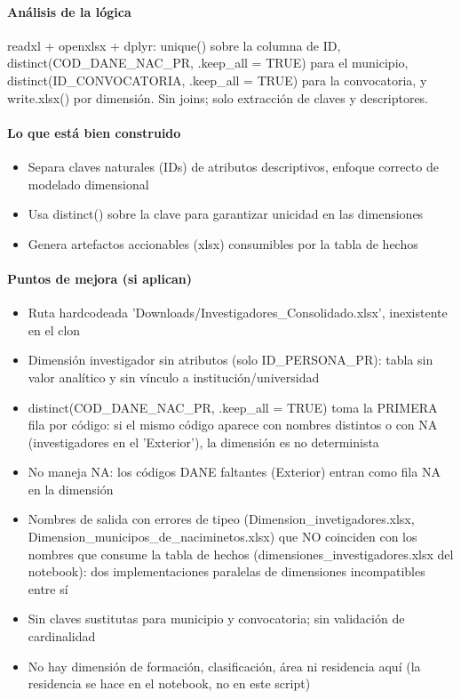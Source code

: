 \paragraph{Análisis de la lógica}
readxl + openxlsx + dplyr: unique() sobre la columna de ID, distinct(COD\_DANE\_NAC\_PR, .keep\_all = TRUE) para el municipio, distinct(ID\_CONVOCATORIA, .keep\_all = TRUE) para la convocatoria, y write.xlsx() por dimensión. Sin joins; solo extracción de claves y descriptores.

\paragraph{Lo que está bien construido}
\begin{itemize}
  \item Separa claves naturales (IDs) de atributos descriptivos, enfoque correcto de modelado dimensional
  \item Usa distinct() sobre la clave para garantizar unicidad en las dimensiones
  \item Genera artefactos accionables (xlsx) consumibles por la tabla de hechos
\end{itemize}

\paragraph{Puntos de mejora (si aplican)}
\begin{itemize}
  \item Ruta hardcodeada 'Downloads/Investigadores\_Consolidado.xlsx', inexistente en el clon
  \item Dimensión investigador sin atributos (solo ID\_PERSONA\_PR): tabla sin valor analítico y sin vínculo a institución/universidad
  \item distinct(COD\_DANE\_NAC\_PR, .keep\_all = TRUE) toma la PRIMERA fila por código: si el mismo código aparece con nombres distintos o con NA (investigadores en el 'Exterior'), la dimensión es no determinista
  \item No maneja NA: los códigos DANE faltantes (Exterior) entran como fila NA en la dimensión
  \item Nombres de salida con errores de tipeo (Dimension\_invetigadores.xlsx, Dimension\_municipos\_de\_naciminetos.xlsx) que NO coinciden con los nombres que consume la tabla de hechos (dimensiones\_investigadores.xlsx del notebook): dos implementaciones paralelas de dimensiones incompatibles entre sí
  \item Sin claves sustitutas para municipio y convocatoria; sin validación de cardinalidad
  \item No hay dimensión de formación, clasificación, área ni residencia aquí (la residencia se hace en el notebook, no en este script)
\end{itemize}

